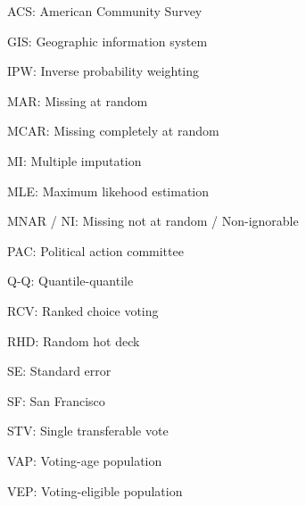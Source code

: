 \documentclass[12pt,twoside]{reedthesis}
\begin{document}
  \begin{abbrevs}
    \noindent ACS: American Community Survey
    
    \par
    
    \noindent GIS: Geographic information system
    
    \par
    
    \noindent IPW: Inverse probability weighting
    
    \par
    
    \noindent MAR: Missing at random
    
    \par
    
    \noindent MCAR: Missing completely at random
    
    \par
    
    \noindent MI: Multiple imputation
    
    \par
    
    \noindent MLE: Maximum likehood estimation
    
    \par
    
    \noindent MNAR / NI: Missing not at random / Non-ignorable
    
    \par
    
    \noindent PAC: Political action committee
    
    \par
    
    \noindent Q-Q: Quantile-quantile
    
    \par
    
    \noindent RCV: Ranked choice voting
    
    \par
    
    \noindent RHD: Random hot deck
    
    \par
    
    \noindent SE: Standard error
    
    \par
    
    \noindent SF: San Francisco
    
    \par
    
    \noindent STV: Single transferable vote
    
    \par
    
    \noindent VAP: Voting-age population
    
    \par
    
    \noindent VEP: Voting-eligible population
    
    \par
  \end{abbrevs}
  \hypersetup{linkcolor=black}
  \setcounter{tocdepth}{1}
  \tableofcontents
\end{document}
